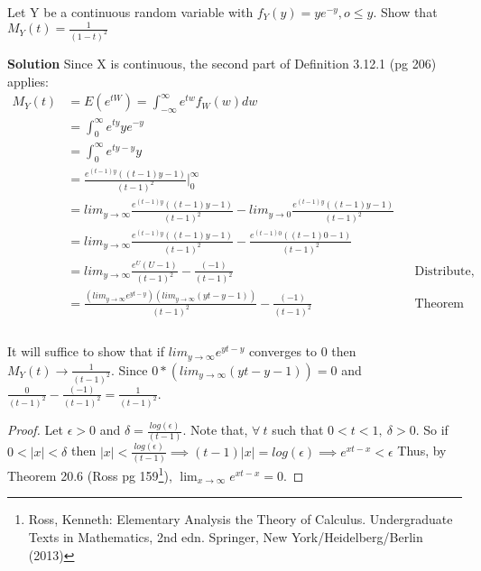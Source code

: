 \documentclass[12pt]{article}
\newenvironment{problem}[2][Problem]{\begin{trivlist}
\item[\hskip \labelsep {\bfseries #1}\hskip \labelsep {\bfseries #2.}]}{\end{trivlist}}
\begin{document}
\begin{problem}{3.12.8} Let Y be a continuous random variable with $f_Y(y) = ye^{-y}, o \leq y$. Show that $M_Y(t) = \frac{1}{(1-t)^2}$ 

\textbf{Solution} Since X is continuous, the second part of Definition 3.12.1 (pg 206) applies:\\
\begin{align*}
M_Y(t) &= E(e^{tW})= \int_{-\infty}^{\infty} e^{tw}f_W(w)dw  \\
&= \int_{0}^{\infty} e^{ty}ye^{-y}  \\
&= \int_{0}^{\infty} e^{ty-y}y \\
&= \frac{e^{(t-1)y}((t-1)y-1)}{(t-1)^2}\Big|_0^{\infty} \\
&= lim_{y\rightarrow \infty} \frac{e^{(t-1)y}((t-1)y-1)}{(t-1)^2}  - lim_{y\rightarrow 0}\frac{e^{(t-1)y}((t-1)y-1)}{(t-1)^2}\\
&= lim_{y\rightarrow \infty} \frac{e^{(t-1)y}((t-1)y-1)}{(t-1)^2}  - \frac{e^{(t-1)0}((t-1)0-1)}{(t-1)^2} \\
&= lim_{y\rightarrow \infty} \frac{e^{U}(U-1)}{(t-1)^2} - \frac{(-1)}{(t-1)^2} && \text{Distribute, let U =(yt-y)} \\
&= \frac{(lim_{y\rightarrow \infty} e^{yt-y})(lim_{y\rightarrow \infty}(yt-y-1))}{(t-1)^2} - \frac{(-1)}{(t-1)^2} && \text{Theorem 20.4 (Ross pg 156)} \\
\end{align*}
\\
It will suffice to show that if $ lim_{y\rightarrow \infty }e^{yt-y} $ converges to 0 then $M_Y(t) \rightarrow \frac{1}{(t-1)^2}$. Since $ 0*(lim_{y\rightarrow \infty}(yt-y-1)) = 0$ and $\frac{0}{(t-1)^2} - \frac{(-1)}{(t-1)^2}=\frac{1}{(t-1)^2}$.
\begin{proof}
Let $\epsilon >0$ and $\delta = \frac{log(\epsilon )}{(t-1)}$. Note that, $ \forall \ t$ such  that  $0<t<1, \ \delta >0$. So if $0<|x|<\delta $ then $|x| < \frac{log(\epsilon ) }{(t-1)} \implies  (t-1)|x| = log(\epsilon )  \implies e^{xt-x}<\epsilon $ Thus, by Theorem 20.6 (Ross pg 159\footnote{Ross, Kenneth: Elementary Analysis the Theory of Calculus. Undergraduate Texts in Mathematics, 2nd edn. Springer, New York/Heidelberg/Berlin (2013)}), $\lim_{x\rightarrow \infty}e^{xt-x} = 0.$
\end{proof}
\end{problem}
\end{document}
